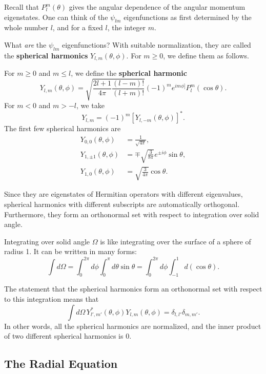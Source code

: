 Recall that $P_l^m(\theta)$ gives the angular dependence of the angular momentum eigenstates. One can think of the $\psi_{lm}$ eigenfunctions as first determined by the whole number $l$, and for a fixed $l$, the integer $m$.

What \textit{are} the $\psi_{lm}$ eigenfunctions? With suitable normalization, they are called the \textbf{spherical harmonics} $Y_{l,m}(\theta,\phi)$. For $m\geq 0$, we define them as follows.

\begin{frameddefn}
    For $m\geq 0$ and $m\leq l$, we define the \textbf{spherical harmonic} $$Y_{l,m}(\theta,\phi)=\sqrt{\frac{2l+1}{4\pi}\frac{(l-m)!}{(l+m)!}}(-1)^me^{im\phi]}P_l^m(\cos\theta).$$For $m<0$ and $m>-l$, we take $$Y_{l,m}=(-1)^m[Y_{l,-m}(\theta,\phi)]^*.$$The first few spherical harmonics are \begin{align*}Y_{0,0}(\theta,\phi)&=\frac{1}{\sqrt{4\pi}},\\ Y_{1,\pm1}(\theta,\phi)&=\mp\sqrt{\frac{3}{8\pi}}e^{\pm i\phi}\sin\theta,\\ Y_{1,0}(\theta,\phi)&=\sqrt{\frac{3}{4\pi}}\cos\theta.\end{align*}
\end{frameddefn}

Since they are eigenstates of Hermitian operators with different eigenvalues, spherical harmonics with different subscripts are automatically orthogonal. Furthermore, they form an orthonormal set with respect to integration over solid angle.

\begin{framedrmk*}
    Integrating over solid angle $\Omega$ is like integrating over the surface of a sphere of radius 1. It can be written in many forms: $$\int d\Omega=\int_0^{2\pi}d\phi\int_0^\pi d\theta\sin\theta=\int_0^{2\pi}d\phi\int_{-1}^1d(\cos\theta).$$
\end{framedrmk*}

The statement that the spherical harmonics form an orthonormal set with respect to this integration means that $$\int d\Omega\, Y^*_{l',m'}(\theta,\phi)Y_{l,m}(\theta,\phi)=\delta_{l,l'}\delta_{m,m'}.$$In other words, all the spherical harmonics are normalized, and the inner product of two different spherical harmonics is $0$.

\subsection{The Radial Equation}\label{radial_equation}

